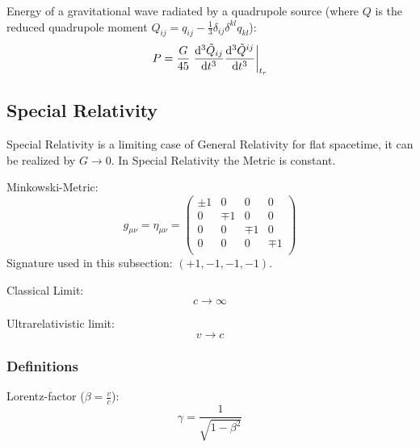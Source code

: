			\noindent
			Energy of a gravitational wave radiated by a quadrupole source (where $Q$ is the reduced quadrupole moment $Q_{ij} = q_{ij} - \frac{1}{3}\delta_{ij}\delta^{kl}q_{kl}$):
			\begin{equation}
				P = \frac{G}{45} \eval{\dv[3]{\tilde{Q}_{ij}}{t}\dv[3]{\tilde{Q}^{ij}}{t}}_{t_r}
			\end{equation}


	\subsection{Special Relativity}
		\noindent
		Special Relativity is a limiting case of General Relativity for flat spacetime, it can be realized by $G \rightarrow 0$. In Special Relativity the Metric is constant.

		\noindent
		Minkowski-Metric:
		\begin{equation}
			g_{\mu\nu} = \eta_{\mu\nu}
			= \left( \begin{matrix}
					\pm1 & 0    & 0    & 0    \\
					0    & \mp1 & 0    & 0    \\
					0    & 0    & \mp1 & 0    \\
					0    & 0    & 0    & \mp1 \\
				\end{matrix} \right)
		\end{equation}
		Signature used in this subsection: $(+1,-1,-1,-1)$.

		\noindent
		Classical Limit:
		\begin{equation}
			c \rightarrow \infty
		\end{equation}

		\noindent
		Ultrarelativistic limit:
		\begin{equation}
			v\rightarrow c
		\end{equation}

		\subsubsection{Definitions}
			\noindent
			Lorentz-factor ($\beta = \frac{v}{c}$):
			\begin{equation}
				\gamma = \frac{1}{\sqrt{1-\beta^2}}
			\end{equation}

